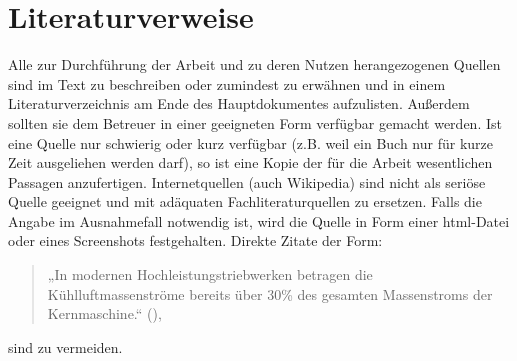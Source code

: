 \section{Literaturverweise}
\label{SECTION:Literaturverweise}

Alle zur Durchführung der Arbeit und zu deren Nutzen herangezogenen Quellen sind im Text zu beschreiben oder zumindest zu erwähnen und in einem Literaturverzeichnis am Ende des Hauptdokumentes aufzulisten. Außerdem sollten sie dem Betreuer in einer geeigneten Form verfügbar gemacht werden. Ist eine Quelle nur schwierig oder kurz verfügbar (z.B. weil ein Buch nur für kurze Zeit ausgeliehen werden darf), so ist eine Kopie der für die Arbeit wesentlichen Passagen anzufertigen. Internetquellen (auch Wikipedia) sind nicht als seriöse Quelle geeignet und mit adäquaten Fachliteraturquellen zu ersetzen. Falls die Angabe im Ausnahmefall notwendig ist, wird die Quelle in Form einer html-Datei oder eines Screenshots festgehalten. Direkte Zitate der Form:
\begin{quote}
	„In modernen Hochleistungstriebwerken betragen die Kühlluftmassenströme bereits über 30\% des gesamten Massenstroms der Kernmaschine.“ (\cite{baldauf2001}),
\end{quote}


sind zu vermeiden.

\nocite{*} %

